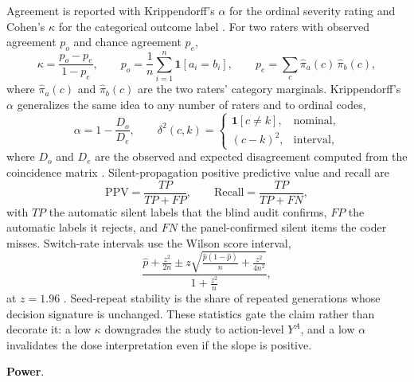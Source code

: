 \documentclass[a4paper,fleqn]{cas-sc}
\begin{document}
Agreement is reported with Krippendorff's $\alpha$ for the ordinal severity rating
\cite{krippendorff,hayes2007} and Cohen's $\kappa$ for the categorical outcome label
\cite{cohen1960,landis1977}.
For two raters with observed agreement $p_o$ and chance agreement $p_e$,
\begin{equation}
  \kappa=\frac{p_o-p_e}{1-p_e},
  \qquad
  p_o=\frac{1}{n}\sum_{i=1}^{n}\mathbf{1}[a_i=b_i],
  \qquad
  p_e=\sum_{c}\hat\pi_a(c)\,\hat\pi_b(c),
  \label{eq:kappa}
\end{equation}
where $\hat\pi_a(c)$ and $\hat\pi_b(c)$ are the two raters' category marginals. Krippendorff's
$\alpha$ generalizes the same idea to any number of raters and to ordinal codes,
\begin{equation}
  \alpha=1-\frac{D_o}{D_e},
  \qquad
  \delta^{2}(c,k)=
  \begin{cases}
    \mathbf{1}[c\neq k], & \text{nominal},\\
    (c-k)^{2}, & \text{interval},
  \end{cases}
  \label{eq:alpha}
\end{equation}
where $D_o$ and $D_e$ are the observed and expected disagreement computed from the coincidence
matrix \cite{krippendorff}. Silent-propagation positive predictive value and recall are
\begin{equation}
  \mathrm{PPV}=\frac{TP}{TP+FP},
  \qquad
  \mathrm{Recall}=\frac{TP}{TP+FN},
  \label{eq:ppv}
\end{equation}
with $TP$ the automatic silent labels that the blind audit confirms, $FP$ the automatic labels it
rejects, and $FN$ the panel-confirmed silent items the coder misses. Switch-rate intervals use the
Wilson score interval,
\begin{equation}
  \frac{\hat p+\frac{z^{2}}{2n}\pm
        z\sqrt{\frac{\hat p(1-\hat p)}{n}+\frac{z^{2}}{4n^{2}}}}
       {1+\frac{z^{2}}{n}},
  \label{eq:wilson}
\end{equation}
at $z=1.96$ \cite{wilson1927}. Seed-repeat stability is the share of repeated generations whose decision signature is
unchanged. These statistics gate the claim rather than decorate it: a low $\kappa$ downgrades the
study to action-level $Y^{A}$, and a low $\alpha$ invalidates the dose interpretation even if the
slope is positive.

\noindent\textbf{Power}.\
\end{document}
